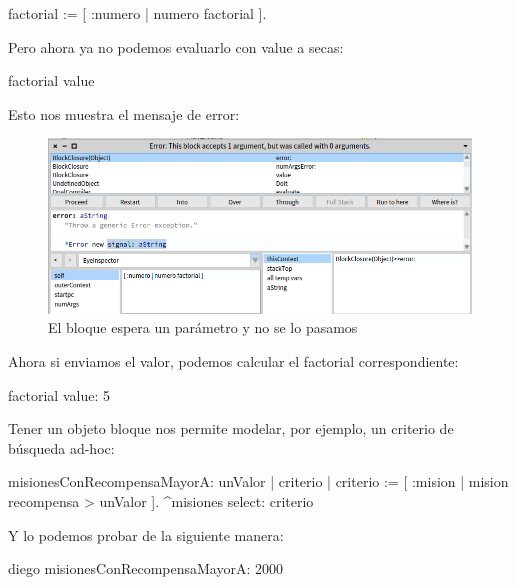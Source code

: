 \documentclass[a4paper,12pt]{book}
\begin{document}
\begin{code}
factorial := [ :numero | numero factorial ].
\end{code}

\vspace{\baselineskip}
Pero ahora ya no podemos evaluarlo con value a secas:

\begin{code}
factorial value
\end{code}

\vspace{\baselineskip}
Esto nos muestra el mensaje de error:

\begin{figure}[h!]
    \centering	
    \includegraphics[width=1\textwidth]{images/17_error_bloque.png}
    \caption{El bloque espera un parámetro y no se lo pasamos}
\end{figure}
\FloatBarrier

\vspace{\baselineskip}
Ahora si enviamos el valor, podemos calcular el factorial correspondiente:

\begin{code}
factorial value: 5
\end{code}

\vspace{\baselineskip}
Tener un objeto bloque nos permite modelar, por ejemplo, un criterio de búsqueda ad-hoc:

\begin{code}
misionesConRecompensaMayorA: unValor
  | criterio |
  criterio := [ :mision | mision recompensa > unValor ].
  ^misiones select: criterio 
\end{code}

Y lo podemos probar de la siguiente manera:

\begin{code}
diego misionesConRecompensaMayorA: 2000
\end{code}
\end{document}
